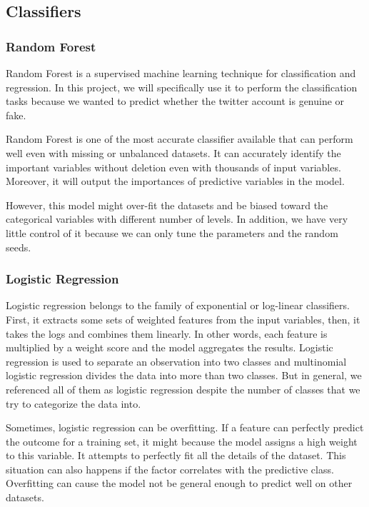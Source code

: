 \documentclass[a4paper, 12pt]{report}
\begin{document}
\subsection*{Classifiers}
\subsubsection*{Random Forest}
Random Forest is a supervised machine learning technique for classification and regression. In this project, we will specifically use it to perform the classification tasks because we wanted to predict whether the twitter account is genuine or fake. \par

\noindent Random Forest is one of the most accurate classifier available that can perform well even with missing or unbalanced datasets. It can accurately identify the important variables without deletion even with thousands of input variables. Moreover, it will output the importances of predictive variables in the model. \par

\noindent However, this model might over-fit the datasets and be biased toward the categorical variables with different number of levels. In addition, we have very little control of it because we can only tune the parameters and the random seeds.

\subsubsection*{Logistic Regression}
Logistic regression belongs to the family of exponential or log-linear classifiers. First, it extracts some sets of weighted features from the input variables, then, it takes the logs and combines them linearly. In other words, each feature is multiplied by a weight score and the model aggregates the results. Logistic regression is used to separate an observation into two classes and multinomial logistic regression divides the data into more than two classes. But in general, we referenced all of them as logistic regression despite the number of classes that we try to categorize the data into. \par

\noindent Sometimes, logistic regression can be overfitting. If a feature can perfectly predict the outcome for a training set, it might because the model assigns a high weight to this variable. It attempts to perfectly fit all the details of the dataset. This situation can also happens if the factor correlates with the predictive class. Overfitting can cause the model not be general enough to predict well on other datasets. 
\end{document}
